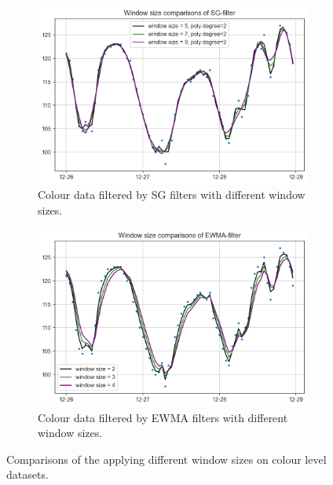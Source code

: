 \begin{figure}[!ht]
  \centering
  \begin{subfigure}{0.7\textwidth}
    \includegraphics[width=\linewidth]{imgs/pre-processing/sg-filter-colour.png}
    \caption{Colour data filtered by SG filters with different window sizes.} \label{fig:smoothed-sg-colour}
  \end{subfigure}%
  \hspace{2em}%
  \begin{subfigure}{0.7\textwidth}
    \includegraphics[width=\linewidth]{imgs/pre-processing/ewma-filter-colour.png}
    \caption{Colour data filtered by EWMA filters with different window sizes.} \label{fig:smoothed-ew-colour}
  \end{subfigure}%
\caption{Comparisons of the applying different window sizes on colour level datasets.} \label{fig:smoothed-colour}
\end{figure}

